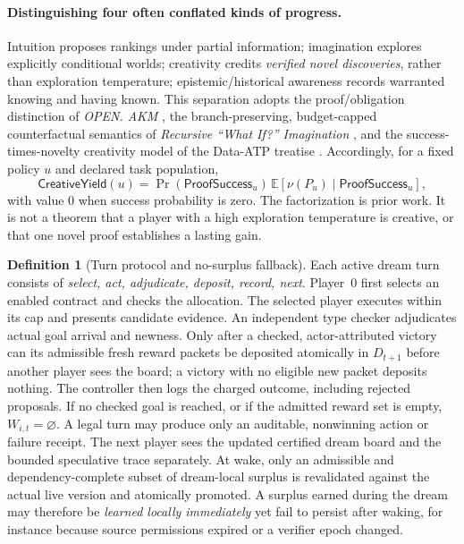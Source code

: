 \documentclass[11pt,letterpaper]{article}
\theoremstyle{definition}
\newtheorem{definition}{Definition}[section]
\theoremstyle{plain}
\theoremstyle{definition}
\begin{document}
\paragraph{Distinguishing four often conflated kinds of progress.}
Intuition proposes rankings under partial information; imagination explores explicitly conditional worlds; creativity credits \emph{verified novel discoveries}, rather than exploration temperature; epistemic/historical awareness records warranted knowing and having known. This separation adopts the proof/obligation distinction of \emph{OPEN. AKM} \cite{tenneson-openakm}, the branch-preserving, budget-capped counterfactual semantics of \emph{Recursive ``What If?'' Imagination} \cite{tenneson-imagination}, and the success-times-novelty creativity model of the Data-ATP treatise \cite{tenneson-creativity}. Accordingly, for a fixed policy $u$ and declared task population,
\[
 \mathsf{CreativeYield}(u)=\Pr(\mathsf{ProofSuccess}_u)\,
 \mathbb E[\nu(P_u)\mid\mathsf{ProofSuccess}_u],
\]
with value $0$ when success probability is zero. The factorization is prior work. It is not a theorem that a player with a high exploration temperature is creative, or that one novel proof establishes a lasting gain.

\begin{definition}[Turn protocol and no-surplus fallback]
Each active dream turn consists of \emph{select, act, adjudicate, deposit, record, next}. Player~0 first selects an enabled contract and checks the allocation. The selected player executes within its cap and presents candidate evidence. An independent type checker adjudicates actual goal arrival and newness. Only after a checked, actor-attributed victory can its admissible fresh reward packets be deposited atomically in $D_{t+1}$ before another player sees the board; a victory with no eligible new packet deposits nothing. The controller then logs the charged outcome, including rejected proposals. If no checked goal is reached, or if the admitted reward set is empty, \(W_{i,t}=\varnothing\). A legal turn may produce only an auditable, nonwinning action or failure receipt. The next player sees the updated certified dream board and the bounded speculative trace separately. At wake, only an admissible and dependency-complete subset of dream-local surplus is revalidated against the actual live version and atomically promoted. A surplus earned during the dream may therefore be \emph{learned locally immediately} yet fail to persist after waking, for instance because source permissions expired or a verifier epoch changed.
\end{definition}
\end{document}
